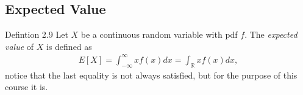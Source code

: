 \subsection{Expected Value}
\begin{boks}{Defintion 2.9}
Let $X$ be a continuous random variable with pdf $f$. The \textit{expected value} of $X$ is defined as
\begin{align*}
    E[X] = \int_{-\infty}^\infty xf(x)dx = \int_\mathbb{R} xf(x)dx,
\end{align*}
notice that the last equality is not always satisfied, but for the purpose of this course it is.
\end{boks}


%

